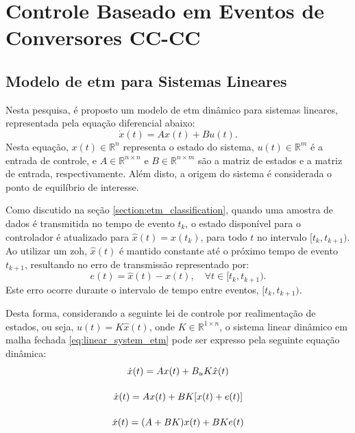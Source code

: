 \chapter{Controle Baseado em Eventos de Conversores CC-CC} \label{cap4}



\section{Modelo de \acrshort{etm} para Sistemas Lineares} \label{section:etm_models}

Nesta pesquisa, é proposto um modelo de \acrshort{etm} dinâmico para sistemas lineares, representada pela equação diferencial abaixo: \begin{equation} \dot{x}(t) = Ax(t) + Bu(t). \label{eq:linear_system_etm}\end{equation} Nesta equação, $ x(t) \in \mathbb{R}^n $ representa o estado do sistema, $ u(t) \in \mathbb{R}^m $ é a entrada de controle, e $ A \in \mathbb{R}^{n \times n} $ e $ B \in \mathbb{R}^{n \times m}$ são a matriz de estados e a matriz de entrada, respectivamente. Além disto, a origem do sistema é considerada o ponto de equilíbrio de interesse.

Como discutido na seção \ref{section:etm_classification}, quando uma amostra de dados é transmitida no tempo de evento $t_k$, o estado disponível para o controlador é atualizado para $\hat{x}(t) = x(t_k)$, para todo $t$ no intervalo $[t_k, t_{k+1})$. Ao utilizar um \acrshort{zoh}, $\hat{x}(t)$ é mantido constante até o próximo tempo de evento $t_{k+1}$, resultando no erro de transmissão representado por: \begin{equation}
  e(t) = \hat{x}(t) - x(t), \quad \forall t \in [t_k, t_{k+1}).
\end{equation} Este erro ocorre durante o intervalo de tempo entre eventos, $ [t_k, t_{k+1})$.

Desta forma, considerando a seguinte lei de controle por realimentação de estados, ou seja, $u(t) = K\hat{x}(t)$, onde $K \in \mathbb{R}^{1 \times n}$, o sistema linear dinâmico em malha fechada \eqref{eq:linear_system_etm} pode ser expresso pela seguinte equação dinâmica: \begin{gather}
  \dot{x}(t) = Ax(t) + B_u K\hat{x}(t) \notag \\[12pt]
  \dot{x}(t) = Ax(t) + BK[x(t) + e(t)] \notag \\[12pt]
  \dot{x}(t) = (A + BK)x(t) + BKe(t)
  \label{eq:etm_closed_loop}
\end{gather}


